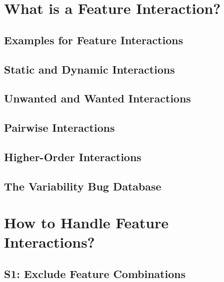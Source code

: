 

\subtitle{9. Feature Interactions}
\author{Thomas Thüm}





\section{What is a Feature Interaction?}

\subsection{Examples for Feature Interactions}
\subsection{Static and Dynamic Interactions}
\subsection{Unwanted and Wanted Interactions}
\subsection{Pairwise Interactions}
\subsection{Higher-Order Interactions}
\subsection{The Variability Bug Database}

%

\lessonslearned{
	\item \ldots
}{
	\item \ldots
}{
	\ldots
}

\sectionend

\section{How to Handle Feature Interactions?}

\subsection{S1: Exclude Feature Combinations}
